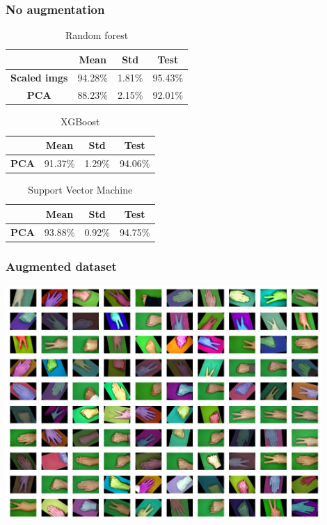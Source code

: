 \documentclass[aspectratio=169]{beamer}
\begin{document}
\begin{frame}
  \frametitle{No augmentation}

  \begin{table}
    \centering
    \captionsetup{labelformat=empty}
    \caption{Random forest}
    \begin{tabular}{|c|c|c|c|}
    \hline
       & Mean & Std & Test \\
      \hline
      \textbf{Scaled imgs} & 94.28\% & 1.81\% & 95.43\% \\
      \hline
      \textbf{PCA} & 88.23\% & 2.15\% & 92.01\% \\
      \hline
    \end{tabular}
  \end{table}

  \begin{table}
    \centering
    \captionsetup{labelformat=empty}
    \caption{XGBoost}
    \begin{tabular}{|c|c|c|c|}
    \hline
       & Mean & Std & Test \\
      \hline
      \textbf{PCA} & 91.37\% & 1.29\% & 94.06\% \\
      \hline
    \end{tabular}
  \end{table}


  \begin{table}
    \centering
    \captionsetup{labelformat=empty}
    \caption{Support Vector Machine}
    \begin{tabular}{|c|c|c|c|}
    \hline
       & Mean & Std & Test \\
      \hline
      \textbf{PCA} & 93.88\% & 0.92\% & 94.75\% \\
      \hline
    \end{tabular}
  \end{table}

  

\end{frame}









\begin{frame}
  \frametitle{Augmented dataset}
\centering
\includegraphics[height=0.85\textheight, width=0.9\textwidth]{images/augmented.png}
\end{frame}
\end{document}
